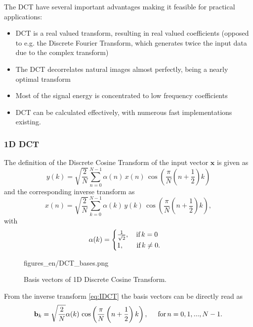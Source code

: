 The DCT have several important advantages making it feasible for practical applications:
\begin{itemize}
\item DCT is a real valued transform, resulting in real valued coefficients (opposed to e.g. the Discrete Fourier Transform, which generates twice the input data due to the complex transform)
\item The DCT decorrelates natural images almost perfectly, being a nearly optimal transform
\item Most of the signal energy is concentrated to low frequency coefficients
\item DCT can be calculated effectively, with numerous fast implementations existing.
\end{itemize}


\subsubsection*{1D DCT}
The definition of the Discrete Cosine Transform of the input vector $\mathbf{x}$ is given as
\begin{equation}
y(k) = \sqrt{\frac{2}{N}} \sum_{n=0}^{N-1} \alpha(n) \, x(n)  \, \cos\left( \frac{\pi}{N} \left( n + \frac{1}{2}\right) k \right)
\label{eq:DCT}
\end{equation}
and the corresponding inverse transform as
\begin{equation}
x(n) = \sqrt{\frac{2}{N}} \sum_{k=0}^{N-1} \alpha(k) \, y(k)  \, \cos\left( \frac{\pi}{N} \left( n + \frac{1}{2}\right) k \right),
\label{eq:IDCT}
\end{equation}
with 
\begin{equation}
\alpha(k) = \begin{cases}  
\frac{1}{\sqrt{2}}, \hspace{3mm} \, \text{if} \, k = 0 \\
1, \hspace{6mm} \, \text{if} \, k \neq 0.
\end{cases}
\end{equation}
\begin{figure}[]
	\centering
	\begin{overpic}[width = 1\columnwidth ]{figures_en/DCT_bases.png}
	\end{overpic}
	\caption{Basis vectors of 1D Discrete Cosine Transform.}
	\label{Fig:1D_dct_bases}
\end{figure}
From the inverse transform \eqref{eq:IDCT} the basis vectors can be directly read as
\begin{equation}
\mathbf{b}_k = \sqrt{\frac{2}{N}}  \alpha(k)  \, \cos\left( \frac{\pi}{N} \left( n + \frac{1}{2}\right) k \right)
, \hspace{5mm} \text{for} \, n = 0,1,...,N-1.
\end{equation}
